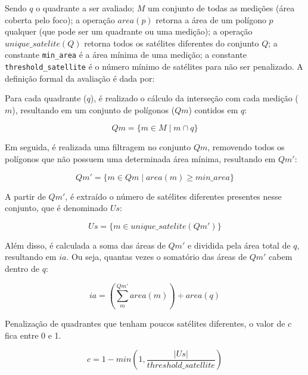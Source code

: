 \documentclass[cic,tc]{iiufrgs}
\begin{document}
Sendo $q$ o quadrante a ser avaliado; $M$ um conjunto de todas as medições (área coberta pelo foco); a operação $area(p)$ retorna a área de um polígono $p$ qualquer (que pode ser um quadrante ou uma medição); a operação $unique\_satelite(Q)$ retorna todos os satélites diferentes do conjunto $Q$; a constante \texttt{min\_area} é a área mínima de uma medição; a constante \texttt{threshold\_satellite} é o número mínimo de satélites para não ser penalizado. A definição formal da avaliação é dada por: \par

Para cada quadrante ($q$), é realizado o cálculo da interseção com cada medição ($m$), resultando em um conjunto de polígonos ($Qm$) contidos em $q$:

\begin{equation} \label{eqn:def_qm}
Qm = \{ m \in M \mid m \cap q \}
\end{equation}

Em seguida, é realizada uma filtragem no conjunto $Qm$, removendo todos os polígonos que não possuem uma determinada área mínima, resultando em $Qm'$:

\begin{equation} \label{eqn:def_qm_line}
Qm' = \{ m \in Qm \mid area\left(m\right) \ge min\_area \}
\end{equation}

A partir de $Qm'$, é extraído o número de satélites diferentes presentes nesse conjunto, que é denominado $Us$:

\begin{equation} \label{eqn:def_us}
Us = \{ m \in unique\_satelite\left(Qm'\right) \}
\end{equation}

Além disso, é calculada a soma das áreas de $Qm'$ e dividida pela área total de $q$, resultando em $ia$. Ou seja, quantas vezes o somatório das áreas de $Qm'$ cabem dentro de $q$:

\begin{equation} \label{eqn:def_ia}
ia = \left(\sum_{m}^{Qm'} area\left(m\right)\right) \div area(q)
\end{equation}

Penalização de quadrantes que tenham poucos satélites diferentes, o valor de $c$ fica entre 0 e 1.

\begin{equation} \label{eqn:def_c}
c = 1 - min\left(1, \frac{|Us|}{threshold\_satellite}\right)
\end{equation}
\end{document}

